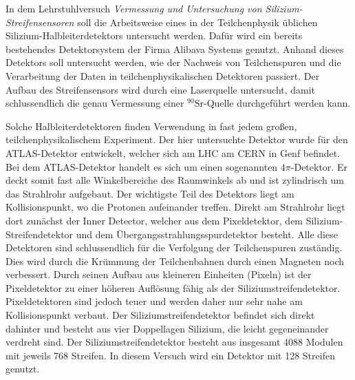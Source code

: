 In dem Lehrstuhlversuch \textit{Vermessung und Untersuchung von Silizium-Streifensensoren} soll die Arbeitsweise eines in der Teilchenphysik üblichen Silizium-Halbleiterdetektors untersucht werden.
Dafür wird ein bereits bestehendes Detektorsystem der Firma Alibava Systems genutzt.
Anhand dieses Detektors soll untersucht werden, wie der Nachweis von Teilchenspuren und die Verarbeitung der Daten in teilchenphysikalischen Detektoren passiert.
Der Aufbau des Streifensensors wird durch eine Laserquelle untersucht, damit schlussendlich die genau Vermessung einer $^{90}\text{Sr}$-Quelle durchgeführt werden kann.

Solche Halbleiterdetektoren finden Verwendung in fast jedem großen, teilchenphysikalischem Experiment.
Der hier untersuchte Detektor wurde für den ATLAS-Detektor entwickelt, welcher sich am LHC am CERN in Genf befindet.
Bei dem ATLAS-Detektor handelt es sich um einen sogenannten $4\pi$-Detektor.
Er deckt somit fast alle Winkelbereiche des Raumwinkels ab und ist zylindrisch um das Strahlrohr aufgebaut.
Der wichtigste Teil des Detektors liegt am Kollisionspunkt, wo die Protonen aufeinander treffen.
Direkt am Strahlrohr liegt dort zunächst der Inner Detector, welcher aus dem Pixeldetektor, dem Silizium-Streifendetektor und dem Übergangsstrahlungsspurdetektor besteht.
Alle diese Detektoren sind schlussendlich für die Verfolgung der Teilchenspuren zuständig.
Dies wird durch die Krümmung der Teilchenbahnen durch einen Magneten noch verbessert.
Durch seinen Aufbau aus kleineren Einheiten (Pixeln) ist der Pixeldetektor zu einer höheren Auflösung fähig als der Siliziumstreifendetektor.
Pixeldetektoren sind jedoch teuer und werden daher nur sehr nahe am Kollisionspunkt verbaut.
Der Siliziumstreifendetektor befindet sich direkt dahinter und besteht aus vier Doppellagen Silizium, die leicht gegeneinander verdreht sind.
Der Siliziumstreifendetektor besteht aus insgesamt 4088 Modulen mit jeweils 768 Streifen.
In diesem Versuch wird ein Detektor mit 128 Streifen genutzt.
